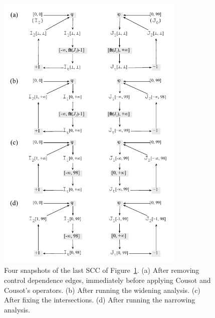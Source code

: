 \documentclass{llncs}
\begin{document}
\begin{figure}[t!]
\begin{center}
\includegraphics[width=0.8\textwidth]{images/ex_partition_grow_crop}
\end{center}
\caption{\label{fig:ex_partition_grow_crop}
Four snapshots of the last SCC of Figure~\ref{fig:ex_partition_grow_crop}.
(a) After removing control dependence edges, immediately before applying
Cousot and Cousot's operators.
(b) After running the widening analysis.
(c) After fixing the intersections.
(d) After running the narrowing analysis.}
\end{figure}
\end{document}
